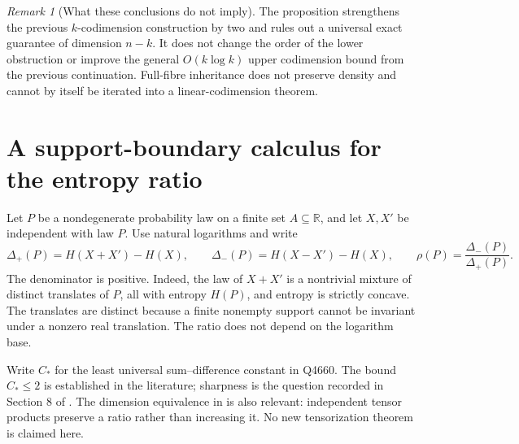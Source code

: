 \documentclass[11pt]{article}
\theoremstyle{remark}
\newtheorem{remark}[theorem]{Remark}
\newcommand{\Dplus}{\Delta_+}
\newcommand{\Dminus}{\Delta_-}
\begin{document}
\begin{remark}[What these conclusions do not imply]
The proposition strengthens the previous $k$-codimension construction by
two and rules out a universal exact guarantee of dimension $n-k$. It does
not change the order of the lower obstruction or improve the general
$O(k\log k)$ upper codimension bound from the previous continuation.
Full-fibre inheritance does not preserve density and cannot by itself be
iterated into a linear-codimension theorem.
\end{remark}

\section{A support-boundary calculus for the entropy ratio}

Let $P$ be a nondegenerate probability law on a finite set $A\subseteq\mathbb R$,
and let $X,X'$ be independent with law $P$. Use natural logarithms and write
\[
 \Dplus(P)=H(X+X')-H(X),\qquad
 \Dminus(P)=H(X-X')-H(X),\qquad
 \rho(P)=\frac{\Dminus(P)}{\Dplus(P)}.
\]
The denominator is positive. Indeed, the law of $X+X'$ is a nontrivial
mixture of distinct translates of $P$, all with entropy $H(P)$, and entropy
is strictly concave. The translates are distinct because a finite
nonempty support cannot be invariant under a nonzero real translation.
The ratio does not depend on the logarithm base.

Write $C_*$ for the least universal sum--difference constant in Q4660.
The bound $C_*\leq2$ is established in the literature; sharpness is the
question recorded in Section 8 of \cite{li}. The dimension equivalence in
\cite{makkuva} is also relevant: independent tensor products preserve a
ratio rather than increasing it. No new tensorization theorem is claimed
here.
\end{document}
